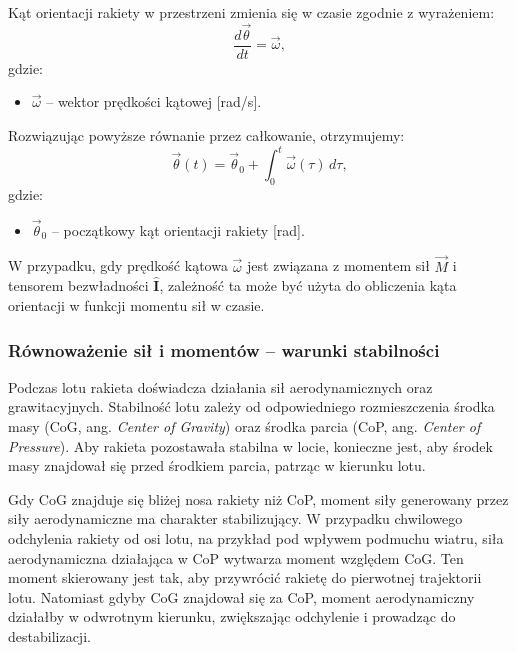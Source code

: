 Kąt orientacji rakiety w przestrzeni zmienia się w czasie zgodnie z wyrażeniem:
\begin{equation}
\frac{d\vec{\theta}}{dt} = \vec{\omega},
\label{eq:orientation_vector}
\end{equation}
gdzie:
\begin{itemize}
\item $\vec{\omega}$ -- wektor prędkości kątowej [rad/s].
\end{itemize}

Rozwiązując powyższe równanie przez całkowanie, otrzymujemy:
\begin{equation}
\vec{\theta}(t) = \vec{\theta}_0 + \int_0^t \vec{\omega}(\tau) \, d\tau,
\label{eq:orientation_integral}
\end{equation}
gdzie:
\begin{itemize}
\item $\vec{\theta}_0$ -- początkowy kąt orientacji rakiety [rad].
\end{itemize}

W przypadku, gdy prędkość kątowa $\vec{\omega}$ jest związana z momentem sił $\vec{M}$ i tensorem bezwładności $\mathbf{\hat{I}}$, zależność ta może być użyta do obliczenia kąta orientacji w funkcji momentu sił w czasie.



\subsubsection{Równoważenie sił i momentów – warunki stabilności}

Podczas lotu rakieta doświadcza działania sił aerodynamicznych oraz grawitacyjnych. Stabilność lotu zależy od odpowiedniego rozmieszczenia środka masy (CoG, ang. \textit{Center of Gravity}) oraz środka parcia (CoP, ang. \textit{Center of Pressure}). Aby rakieta pozostawała stabilna w locie, konieczne jest, aby środek masy znajdował się przed środkiem parcia, patrząc w kierunku lotu.

Gdy CoG znajduje się bliżej nosa rakiety niż CoP, moment siły generowany przez siły aerodynamiczne ma charakter stabilizujący. W przypadku chwilowego odchylenia rakiety od osi lotu, na przykład pod wpływem podmuchu wiatru, siła aerodynamiczna działająca w CoP wytwarza moment względem CoG. Ten moment skierowany jest tak, aby przywrócić rakietę do pierwotnej trajektorii lotu. Natomiast gdyby CoG znajdował się za CoP, moment aerodynamiczny działałby w odwrotnym kierunku, zwiększając odchylenie i prowadząc do destabilizacji.

